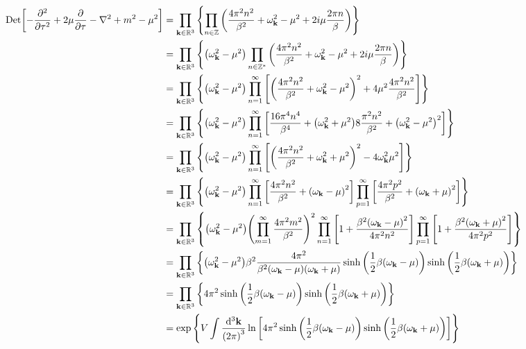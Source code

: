 \documentclass[twoside]{amsart}
\newcommand{\Det}[1]{\textup{Det} #1}
\numberwithin{equation}{section}
\begin{document}
\begin{align}
     \Det\qty[-\pdv[2]{}{\tau}+2\mu\pdv{}{\tau}-\laplacian+m^2-\mu^2] &=\prod\limits_{\vb k\in\mathbb R^3}\qty{\prod\limits_{n\in\mathbb Z}\qty(\frac{4\pi^2n^2}{\beta^2}+\omega_{\vb k}^2-\mu^2+2i\mu\frac{2\pi n}{\beta})}\\
     &=\prod\limits_{\vb k\in\mathbb R^3}\qty{\qty(\omega_{\vb k}^2-\mu^2)\prod\limits_{n\in\mathbb Z^\ast}\qty(\frac{4\pi^2n^2}{\beta^2}+\omega_{\vb k}^2-\mu^2+2i\mu\frac{2\pi n}{\beta})}\\
     &=\prod\limits_{\vb k\in\mathbb R^3}\qty{\qty(\omega_{\vb k}^2-\mu^2)\prod\limits_{n=1}^{\infty}\qty[\qty(\frac{4\pi^2n^2}{\beta^2}+\omega_{\vb k}^2-\mu^2)^2+4\mu^2\frac{4\pi^2 n^2}{\beta^2}]}\\
     &=\prod\limits_{\vb k\in\mathbb R^3}\qty{\qty(\omega_{\vb k}^2-\mu^2)\prod\limits_{n=1}^{\infty}\qty[\frac{16\pi^4n^4}{\beta^4}+\qty(\omega_{\vb k}^2+\mu^2)8\frac{\pi^2n^2}{\beta^2}+\qty(\omega_{\vb k}^2-\mu^2)^2]}\\
     &=\prod\limits_{\vb k\in\mathbb R^3}\qty{\qty(\omega_{\vb k}^2-\mu^2)\prod\limits_{n=1}^{\infty}\qty[\qty(\frac{4\pi^2n^2}{\beta^2}+\omega_{\vb k}^2+\mu^2)^2-4\omega_{\vb k}^2\mu^2]}\\
     &=\prod\limits_{\vb k\in\mathbb R^3}\qty{\qty(\omega_{\vb k}^2-\mu^2)\prod\limits_{n=1}^{\infty}\qty[\frac{4\pi^2n^2}{\beta^2}+\qty(\omega_{\vb k}-\mu)^2]\prod\limits_{p=1}^{\infty}\qty[\frac{4\pi^2p^2}{\beta^2}+\qty(\omega_{\vb k}+\mu)^2]}\\
     &=\prod\limits_{\vb k\in\mathbb R^3}\qty{\qty(\omega_{\vb k}^2-\mu^2)\qty(\prod\limits_{m=1}^{\infty}\frac{4\pi^2 m^2}{\beta^2})^2\prod\limits_{n=1}^{\infty}\qty[1+\frac{\beta^2\qty(\omega_{\vb k}-\mu)^2}{4\pi^2n^2}]\prod\limits_{p=1}^{\infty}\qty[1+\frac{\beta^2\qty(\omega_{\vb k}+\mu)^2}{4\pi^2p^2}]}\\
     &=\prod\limits_{\vb k\in\mathbb R^3}\qty{\qty(\omega_{\vb k}^2-\mu^2)\beta^2\frac{4\pi^2}{\beta^2\qty(\omega_{\vb k}-\mu)\qty(\omega_{\vb k}+\mu)}\sinh\qty(\frac12\beta\qty(\omega_{\vb k}-\mu))\sinh\qty(\frac12\beta\qty(\omega_{\vb k}+\mu))}\\
     &=\prod\limits_{\vb k\in\mathbb R^3}\qty{4\pi^2\sinh\qty(\frac12\beta\qty(\omega_{\vb k}-\mu))\sinh\qty(\frac12\beta\qty(\omega_{\vb k}+\mu))}\\
     &=\exp\qty{V\int\frac{\dd[3]{\vb k}}{\qty(2\pi)^3}\ln\qty[4\pi^2\sinh\qty(\frac12\beta\qty(\omega_{\vb k}-\mu))\sinh\qty(\frac12\beta\qty(\omega_{\vb k}+\mu))]}\\
\end{align}
\end{document}
